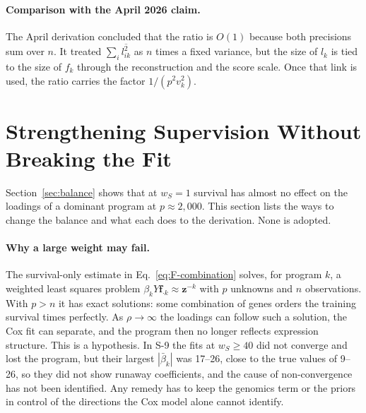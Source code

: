\documentclass[11pt]{article}
\newcommand{\betabar}[1]{\bar{\beta}_{#1}}
\newcommand{\lsec}[2]{\overline{l^2_{#1#2}}}
\newcommand{\ws}{w_S}
\begin{document}
\paragraph{Comparison with the April 2026 claim.} The April derivation
concluded that the ratio is $O(1)$ because both precisions sum over $n$. It
treated $\sum_i\lsec{i}{k}$ as $n$ times a fixed variance, but the size of $l_k$
is tied to the size of $f_k$ through the reconstruction and the score scale.
Once that link is used, the ratio carries the factor $1/(p^2v_k^2)$.

\section{Strengthening Supervision Without Breaking the Fit}\label{sec:strengthen}

Section~\ref{sec:balance} shows that at $\ws = 1$ survival has almost no effect on
the loadings of a dominant program at $p\approx 2{,}000$. This section lists the
ways to change the balance and what each does to the derivation. None is
adopted.

\paragraph{Why a large weight may fail.} The survival-only estimate in
Eq.~\eqref{eq:F-combination} solves, for program $k$, a weighted least squares
problem $\beta_k Y\bm f_{\cdot k}\approx\bm z^{-k}$ with $p$ unknowns and $n$
observations. With $p > n$ it has exact solutions: some combination of genes
orders the training survival times perfectly. As $\rho\to\infty$ the loadings
can follow such a solution, the Cox fit can separate, and the program then no
longer reflects expression structure. This is a hypothesis. In S-9 the fits at
$\ws\ge 40$ did not converge and lost the program, but their largest $|\betabar{k}|$
was 17--26, close to the true values of 9--26, so they did not show runaway
coefficients, and the cause of non-convergence has not been identified.
Any remedy has to keep the genomics term or the priors in control of the
directions the Cox model alone cannot identify.
\end{document}
